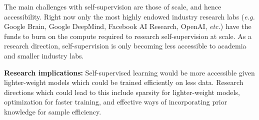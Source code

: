 The main challenges with self-supervision are those of scale, and hence
accessibility. Right now only the most highly endowed industry research labs
(\emph{e.g.} Google Brain, Google DeepMind, Facebook AI Research, OpenAI,
\emph{etc.}) have the funds to burn on the compute required to research
self-supervision at scale. As a research direction, self-supervision is only
becoming less accessible to academia and smaller industry labs.

{\bf Research implications:} Self-supervised learning would be more accessible
given lighter-weight models which could be trained efficiently on less data.
Research directions which could lead to this include sparsity for
lighter-weight models, optimization for faster training, and effective ways of
incorporating prior knowledge for sample efficiency.

